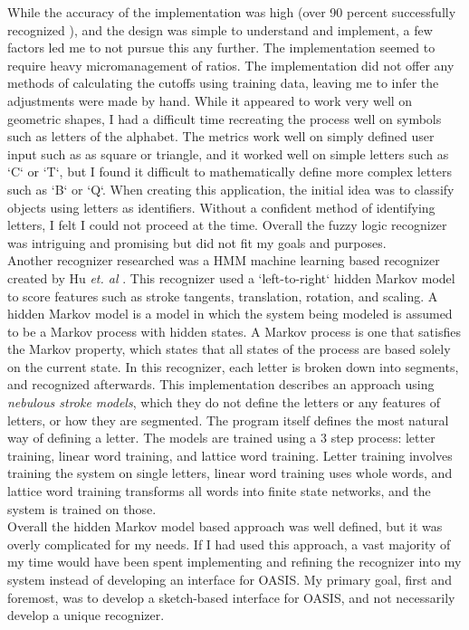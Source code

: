 While the accuracy of the implementation was high (over 90 percent successfully recognized \cite{fuzzylogic}), and the design was simple to understand and implement, a few factors led me to not pursue this any further. The implementation seemed to require heavy micromanagement of ratios. The implementation did not offer any methods of calculating the cutoffs using training data, leaving me to infer the adjustments were made by hand. While it appeared to work very well on geometric shapes, I had a difficult time recreating the process well on symbols such as letters of the alphabet. The metrics work well on simply defined user input such as as square or triangle, and it worked well on simple letters such as `C` or `T`, but I found it difficult to mathematically define more complex letters such as `B` or `Q`. When creating this application, the initial idea was to classify objects using letters as identifiers. Without a confident method of identifying letters, I felt I could not proceed at the time. Overall the fuzzy logic recognizer was intriguing and promising but did not fit my goals and purposes. \\

Another recognizer researched was a HMM machine learning based recognizer created by Hu \textit{et. al} \cite{hmm1994}. This recognizer used a      `left-to-right` hidden Markov model to score features such as  stroke tangents, translation, rotation, and scaling. A hidden Markov model is a model in which the system being modeled is assumed to be a Markov process with hidden states. A Markov process is one that satisfies the Markov property, which states that all states of the process are based solely on the current state. In this recognizer, each letter is broken down into segments, and recognized afterwards. This implementation describes an approach using \textit{nebulous stroke models}, which they do not define the letters or any features of letters, or how they are segmented. The program itself defines the most natural way of defining a letter. The models are trained using a 3 step process: letter training, linear word training, and lattice word training. Letter training involves training the system on single letters, linear word training uses whole words, and lattice word training transforms all words into finite state networks, and the system is trained on those. \\ 

Overall the hidden Markov model based approach was well defined, but it was overly complicated for my needs. If I had used this approach, a vast majority of my time would have been spent implementing and refining the recognizer into my system instead of developing an interface for OASIS. My primary goal, first and foremost, was to develop a sketch-based interface for OASIS, and not necessarily develop a unique recognizer.

